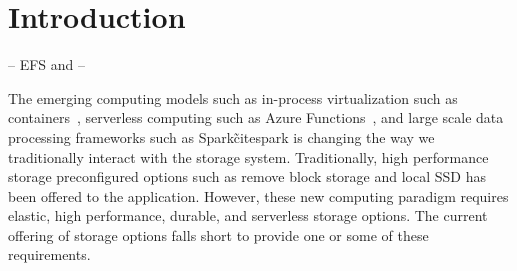\section{Introduction}
\label{sec:intro}



-- EFS and 
-- 


The emerging computing models such as in-process virtualization such as containers~\cite{docker,kubernetees}, serverless computing such as Azure Functions~\cite{azurefunctions}, and large scale data processing frameworks such as Spark\~cite{spark} is changing the way we traditionally interact with the storage system.
Traditionally, high performance storage preconfigured options such as remove block storage and local SSD has been offered to the application.   
However, these new computing paradigm requires elastic, high performance, durable, and serverless storage options. The current offering of storage options falls short to provide one or some of these requirements. 


